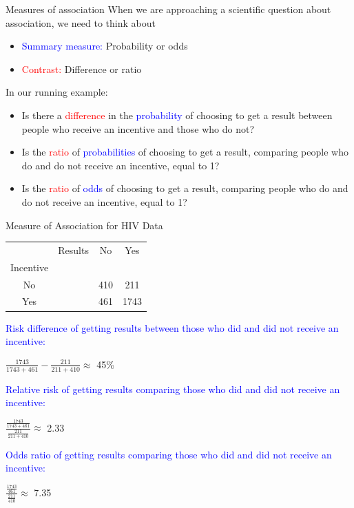 \documentclass[10pt,t]{beamer}
\begin{document}
\begin{frame}{Measures of association}
When we are approaching a scientific question about association, we need to think about
\medskip

\begin{itemize}
	\item \textcolor{blue}{Summary measure:} Probability or odds
	\medskip
	\item \textcolor{red}{Contrast:} Difference or ratio
\end{itemize}
\vspace{0.5cm}  
In our running example:
\medskip
\begin{itemize}
	\item Is there a \textcolor{red}{difference} in the \textcolor{blue}{probability} of choosing to get a result between people who receive an incentive and those who do not?  
	\medskip
	
	\item Is the \textcolor{red}{ratio} of \textcolor{blue}{probabilities} of choosing to get a result, comparing people who do and do not receive an incentive, equal to 1?  
	\medskip
	
	\item Is the \textcolor{red}{ratio} of \textcolor{blue}{odds} of choosing to get a result, comparing people who do and do not receive an incentive, equal to 1? 
\end{itemize}
\end{frame}

\begin{frame}{Measure of Association for HIV Data}
	
		\vspace{-8 mm}
	
	\begin{table}
		\centering
		\begin{tabular}{cc|c|c|}
			&Results &No & Yes\\
			Incentive& && \\
			\hline
			No &&410&211\\\hline
			Yes &&461&1743
		\end{tabular}
	\end{table}
	\smallskip
	
	\textcolor{blue}{Risk difference of getting results between those who did and did not receive an incentive:}
	
	\medskip
	\large
	 $\frac{1743}{1743+461}-\frac{211}{211+410}\approx$ 45\%
	\medskip
	\normalsize
	
	\textcolor{blue}{Relative risk of getting results comparing those who did and did not receive an incentive:}
	
	\large
	\medskip
	 $\frac{\frac{1743}{1743+461}}{\frac{211}{211+410}}\approx$ 2.33
	\medskip
	\normalsize
	
	\textcolor{blue}{Odds ratio of getting results comparing those who did and did not receive an incentive:}
	
	\large
	\medskip
	 $\frac{\frac{1743}{461}}{\frac{211}{410}}\approx$ 7.35

	
\end{frame}
\end{document}
